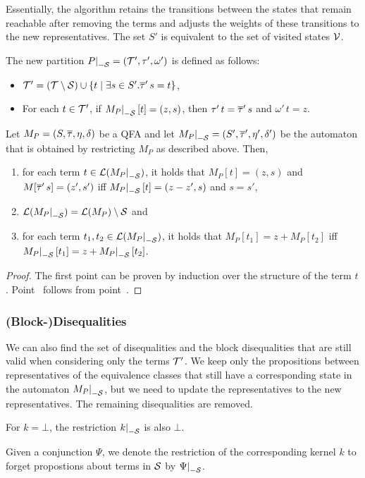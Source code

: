 Essentially, the algorithm retains the transitions between the states that remain reachable after removing the terms and adjusts the weights of these transitions to the new representatives.
The set $S'$ is equivalent to the set of visited states $\mathcal{V}$.

The new partition $\restr{P}{-\Set} = (\T', \tau', \omega')$ is defined as follows:
\begin{itemize}
    \item $\mathcal{T}' = (\mathcal{T} \setminus \mathcal{S}) \cup \{t \mid \exists s \in S' . \overline{\tau}'\,s = t\}$,
    \item For each $t \in \mathcal{T}'$, if $\restr{M_P}{-\Set}[t] = (z, s)$, then $\tau'\,t = \overline{\tau}'\,s$ and $\omega'\,t = z$.
\end{itemize}

\begin{theorem}\label{restriction}
    Let $M_P = (S, \overline{\tau}, \eta, \delta)$ be a QFA and let $\restr{M_P}{-\Set} = (S', \otau', \eta', \delta')$ be the automaton that is obtained by restricting $M_P$ as described above.
    Then,
    \begin{enumerate}
        \item\label{item:lemma-restriction} for each term $t \in \L(\restr{M_P}{-\Set})$, it holds that $M_P[t] = (z, s)$ and $M[\overline{\tau}'\,s] = (z', s')$ iff $\restr{M_P}{-\Set}[t] = (z - z', s)$ and $s = s'$,
        \item $\L(\restr{M_P}{-\Set}) = \L(M_P) \setminus \Set$ and
              \item\label{item:correctness-restriction} for each term $t_1, t_2 \in \L(\restr{M_P}{-\Set})$, it holds that $M_P[t_1] = z + M_P[t_2]$ iff $\restr{M_P}{-\Set}[t_1] = z + \restr{M_P}{-\Set}[t_2]$.
    \end{enumerate}
\end{theorem}
\begin{proof}
    The first point can be proven by induction over the structure of the term $t$.
    Point~ follows from point~.
\end{proof}
\subsubsection{(Block-)Disequalities}
We can also find the set of disequalities and the block disequalities that are still valid when considering only the terms $\mathcal{T}'$.
We keep only the propositions between representatives of the equivalence classes that
still have a corresponding state in the automaton $\restr{M_P}{-\Set}$, but we need to update the representatives to the new representatives.
The remaining disequalities are removed.

For $k = \bot$, the restriction $\restr{k}{-\Set}$ is also $\bot$.

Given a conjunction $\Psi$, we denote the restriction of the corresponding kernel $k$ to forget propostions about terms in $\mathcal{S}$ by $\restr{\Psi}{-\Set}$.
